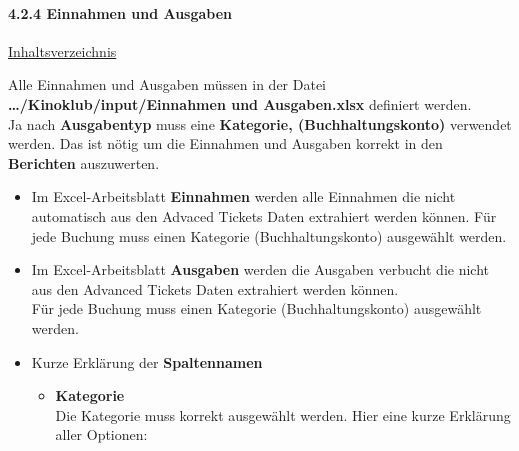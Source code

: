 \documentclass[
]{article}
\providecommand{\tightlist}{%
  \setlength{\itemsep}{0pt}\setlength{\parskip}{0pt}}
\begin{document}
\paragraph{4.2.4 Einnahmen und Ausgaben}\label{einnahmen-und-ausgaben}

\hyperref[Inhaltsverzeichnis]{Inhaltsverzeichnis}

Alle Einnahmen und Ausgaben müssen in der Datei
\textbf{\ldots/Kinoklub/input/Einnahmen und Ausgaben.xlsx} definiert
werden.\\
Ja nach \textbf{Ausgabentyp} muss eine \textbf{Kategorie,
(Buchhaltungskonto)} verwendet werden. Das ist nötig um die Einnahmen
und Ausgaben korrekt in den \textbf{Berichten} auszuwerten.

\begin{itemize}
\tightlist
\item
  Im Excel-Arbeitsblatt \textbf{Einnahmen} werden alle Einnahmen die
  nicht automatisch aus den Advaced Tickets Daten extrahiert werden
  können. Für jede Buchung muss einen Kategorie (Buchhaltungskonto)
  ausgewählt werden.
\item
  Im Excel-Arbeitsblatt \textbf{Ausgaben} werden die Ausgaben verbucht
  die nicht aus den Advanced Tickets Daten extrahiert werden können.\\
  Für jede Buchung muss einen Kategorie (Buchhaltungskonto) ausgewählt
  werden.
\item
  Kurze Erklärung der \textbf{Spaltennamen}

  \begin{itemize}
  \tightlist
  \item
    \textbf{Kategorie}\\
    Die Kategorie muss korrekt ausgewählt werden. Hier eine kurze
    Erklärung aller Optionen:


\end{itemize}
\end{itemize}
\end{document}
